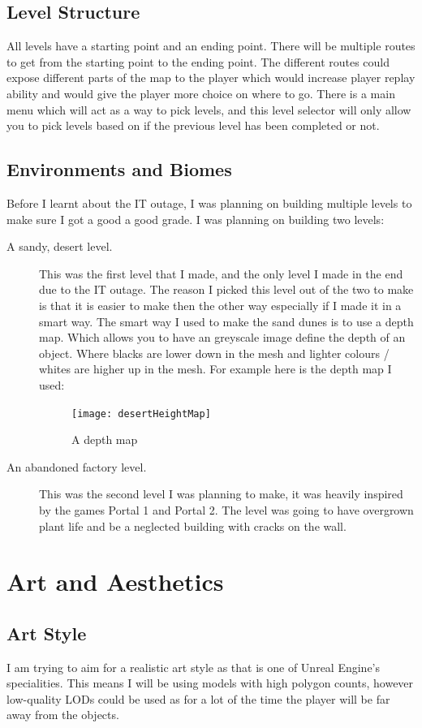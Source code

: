 \documentclass[12pt]{article}
\begin{document}
	\subsection{Level Structure}
	All levels have a starting point and an ending point. There will be multiple routes to get from the starting point to the ending point. The different routes could expose different parts of the map to the player which would increase player replay ability and would give the player more choice on where to go. There is a main menu which will act as a way to pick levels, and this level selector will only allow you to pick levels based on if the previous level has been completed or not.


	\subsection{Environments and Biomes}
	Before I learnt about the IT outage, I was planning on building multiple levels to make sure I got a good a good grade. I was planning on building two levels:
	\begin{description}
	  \item[A sandy, desert level.] This was the first level that I made, and the only level I made in the end due to the IT outage. The reason I picked this level out of the two to make is that it is easier to make then the other way especially if I made it in a smart way. The smart way I used to make the sand dunes is to use a depth map. Which allows you to have an greyscale image define the depth of an object. Where blacks are lower down in the mesh and lighter colours / whites are higher up in the mesh. For example here is the depth map I used:
			\begin{figure}[h]
			  \texttt{[image: desertHeightMap]}
			  \centering
			  \caption{A depth map}
			\end{figure}
	  \item[An abandoned factory level.] This was the second level I was planning to make, it was heavily inspired by the games Portal 1 and Portal 2. The level was going to have overgrown plant life and be a neglected building with cracks on the wall.
	\end{description}
	
	\section{Art and Aesthetics}
	\subsection{Art Style}
	I am trying to aim for a realistic art style as that is one of Unreal Engine's specialities. This means I will be using models with high polygon counts, however low-quality LODs could be used as for a lot of the time the player will be far away from the objects.
\end{document}
